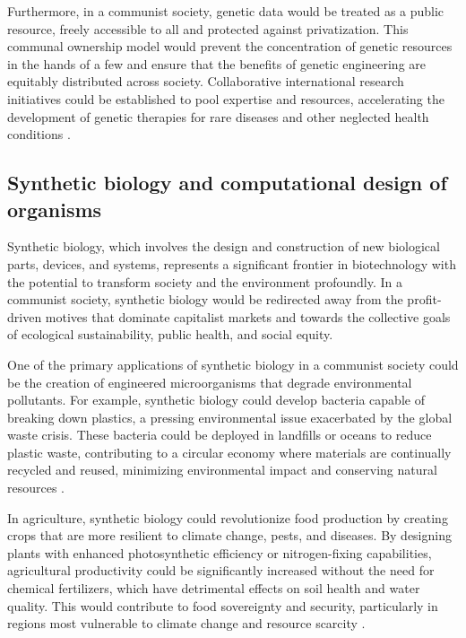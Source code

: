 Furthermore, in a communist society, genetic data would be treated as a public resource, freely accessible to all and protected against privatization. This communal ownership model would prevent the concentration of genetic resources in the hands of a few and ensure that the benefits of genetic engineering are equitably distributed across society. Collaborative international research initiatives could be established to pool expertise and resources, accelerating the development of genetic therapies for rare diseases and other neglected health conditions \cite[pp.~78-82]{davis2018ethics}.

\subsection{Synthetic biology and computational design of organisms}

Synthetic biology, which involves the design and construction of new biological parts, devices, and systems, represents a significant frontier in biotechnology with the potential to transform society and the environment profoundly. In a communist society, synthetic biology would be redirected away from the profit-driven motives that dominate capitalist markets and towards the collective goals of ecological sustainability, public health, and social equity.

One of the primary applications of synthetic biology in a communist society could be the creation of engineered microorganisms that degrade environmental pollutants. For example, synthetic biology could develop bacteria capable of breaking down plastics, a pressing environmental issue exacerbated by the global waste crisis. These bacteria could be deployed in landfills or oceans to reduce plastic waste, contributing to a circular economy where materials are continually recycled and reused, minimizing environmental impact and conserving natural resources \cite[pp.~220-225]{anderson2016biology}.

In agriculture, synthetic biology could revolutionize food production by creating crops that are more resilient to climate change, pests, and diseases. By designing plants with enhanced photosynthetic efficiency or nitrogen-fixing capabilities, agricultural productivity could be significantly increased without the need for chemical fertilizers, which have detrimental effects on soil health and water quality. This would contribute to food sovereignty and security, particularly in regions most vulnerable to climate change and resource scarcity \cite[pp.~310-315]{singh2017biosensors}.

